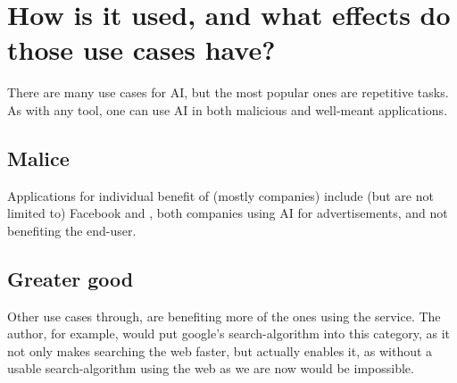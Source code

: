 \chapter{How is it used, and what effects do those use cases have?}




There are many use cases for AI, but the most popular ones are repetitive tasks. As with any tool, one can use AI in both malicious and well-meant applications.
\section{Malice}
Applications for individual benefit of (mostly companies) include (but are not limited to) Facebook \cite{facebookWerbungAufInstagram} and \cite{googleOnlinewerbungLeichtGemacht}, both companies using AI for advertisements, and not benefiting the end-user.
\section{Greater good}
Other use cases through, are benefiting more of the ones using the service. The author, for example, would put google's search-algorithm \cite{googleFunktioniertGoogleSucheSuchalgorithmen} into this category, as it not only makes searching the web faster, but actually enables it, as without a usable search-algorithm using the web as we are now would be impossible.